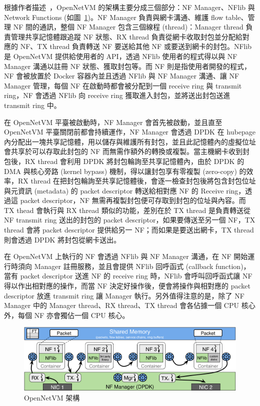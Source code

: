 
根據作者描述~\cite{netvm}\cite{paper.opennetvm}，OpenNetVM 的架構主要分成三個部分：NF Manager、NFlib 與 Network Functions (如圖~\ref{fig:netvm_arch})。NF Manager 負責與網卡溝通、維護 flow table、管理 NF 間的通訊，整個 NF Manager 包含三個線程 (thread)：Manager thread 負責管理共享記憶體跟追蹤 NF 狀態、RX thread 負責從網卡收取封包並分配給對應的 NF、TX thread 負責轉送 NF 要送給其他 NF 或要送到網卡的封包。NFlib 是 OpenNetVM 提供給使用者的 API，透過 NFlib 使用者的程式得以與 NF Manager 溝通以註冊 NF 狀態、獲取封包等。而 NF 則是指使用者開發的程式，NF 會被放置於 Docker 容器內並且透過 NFlib 與 NF Manager 溝通、讓 NF Manager 管理，每個 NF 在啟動時都會被分配到一個 receive ring 與 transmit ring，NF 會透過 NFlib 向 receive ring 獲取進入封包，並將送出封包送進 transmit ring 中。

在 OpenNetVM 平臺被啟動時，NF Manager 會首先被啟動，並且直至 OpenNetVM 平臺關閉前都會持續運作，NF Manager 會透過 DPDK 在 hubepage 內分配出一塊共享記憶體，用以儲存與維護所有封包，並且此記憶體內的虛擬位址會共享於可以存取此封包的 NF 而無需作額外的轉換或複製。當主機網卡收到封包後，RX thread 會利用 DPDK 將封包輪詢至共享記憶體內，由於 DPDK 的 DMA 與核心旁路 (kernel bypass) 機制，得以讓封包享有零複製 (zero-copy) 的效率，RX thread 在把封包輪詢至共享記憶體後，會逐一檢查封包後將包含封包位址與元資訊 (metadata) 的 packet descriptor 轉送給相對應 NF 的 Receive ring，透過這 packet descriptor，NF 無需再複製封包便可存取到封包的位址與內容。而 TX thead 會執行與 RX thread 類似的功能，差別在於 TX thread 是負責轉送從 NF transmit ring 送出的封包的 packet descriptor，如果要傳送至另一個 NF，TX thread 會將 packet descriptor 提供給另一 NF；而如果是要送出網卡，TX thread 則會透過 DPDK 將封包從網卡送出。

在 OpenNetVM 上執行的 NF 會透過 NFlib 與 NF Manager 溝通，在 NF 開始運行時須向 Manager 註冊服務，並且會提供 NFlib 回呼函式 (callback function)，當有 packet descriptor 送進 NF 的 receive ring 時，NFlib 會呼叫回呼函式讓 NF 得以作出相對應的操作，而當 NF 決定好操作後，便會將操作與相對應的 packet descriptor 放進 transmit ring 讓 Manager 執行。另外值得注意的是，除了 NF Manager 中的 Manager thread、RX thread、TX thread 會各佔據一個 CPU 核心外，每個 NF 亦會獨佔一個 CPU 核心。

\begin{figure}[htbp]
    \centering
    \includegraphics[height=!,width=1\linewidth,keepaspectratio=true]{figures/netvm-arch.png}
    \caption[OpenNetVM 架構]{{\footnotesize OpenNetVM 架構 \cite{onvm}}}
    \label{fig:netvm_arch}
\end{figure}

